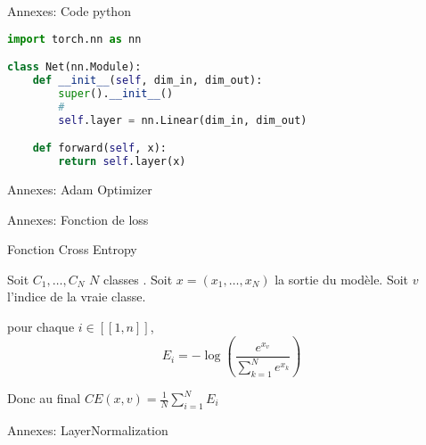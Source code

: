 \documentclass[12pt]{beamer}
\begin{document}
\begin{frame}[fragile]{Annexes: Code python}
\footnotesize
\begin{tcolorbox}[colback=white,boxsep=2mm,arc=1pt,
    auto outer arc,left=1mm,right=1mm,top=1mm,bottom=1mm,boxrule=0.5pt,width=\textwidth]
\begin{lstlisting}[language=python]
import torch.nn as nn

class Net(nn.Module):  
    def __init__(self, dim_in, dim_out):
        super().__init__()
        #
        self.layer = nn.Linear(dim_in, dim_out)

    def forward(self, x):
        return self.layer(x)
\end{lstlisting}
\end{tcolorbox}
\normalsize
\end{frame}




\begin{frame}{Annexes: Adam Optimizer}



\end{frame}





\begin{frame}{Annexes: Fonction de loss}

Fonction Cross Entropy

Soit $C_1, \dots, C_N$  $N$ classes . Soit $x = (x_1, \dots, x_N)$ la sortie du modèle.
Soit $v$ l'indice de la vraie classe.

pour chaque $i \in [\![1, n]\!]$, $$E_i = - \log \left ( \frac{e^{x_v}}{\sum_{k=1}^N e^{x_k}} \right )$$

Donc au final $CE(x, v) = \frac{1}{N} \sum_{i=1}^N E_i$ 


\end{frame}





\begin{frame}{Annexes: LayerNormalization}



\end{frame}




\end{document}
